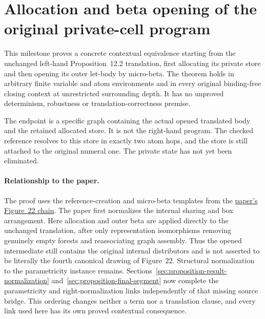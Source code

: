 \clearpage
\section{Allocation and beta opening of the original private-cell program}
\label{sec:proposition-opening}
This milestone proves a concrete contextual equivalence starting from the
unchanged left-hand Proposition~12.2 translation, first allocating its private
store and then opening its outer let-body by micro-beta. The theorem holds
in arbitrary finite variable and atom environments and in every original
binding-free closing context at unrestricted surrounding depth. It has no
unproved determinism, robustness or translation-correctness premise.

The endpoint is a specific graph containing the actual opened translated
body and the retained allocated store. It is not the right-hand program.
The checked reference resolves to this store in exactly two atom hops, and
the store is still attached to the original numeral one. The private state
has not yet been eliminated.

\paragraph{Relationship to the paper.}
The proof uses the reference-creation and micro-beta templates from the
\href{https://arxiv.org/html/1907.01257v5\#S12.SS3}{paper's Figure~22 chain}.
The paper first normalizes the internal sharing and box arrangement. Here
allocation and outer beta are applied directly to the unchanged translation,
after only representation isomorphisms removing genuinely empty forests and
reassociating graph assembly. Thus the opened intermediate still contains
the original internal distributors and is not asserted to be literally the
fourth canonical drawing of Figure~22. Structural normalization to the
parametricity instance remains. Sections~\ref{sec:proposition-result-normalization}
and~\ref{sec:proposition-final-segment} now complete the parametricity and
right-normalization links independently of that missing source bridge. This ordering changes neither a term nor a translation clause, and
every link used here has its own proved contextual consequence.


